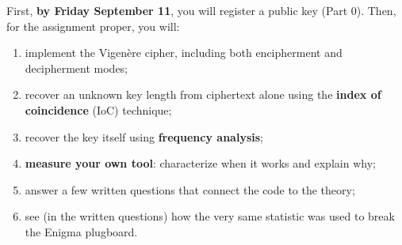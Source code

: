 \documentclass[11pt]{article}
\begin{document}
\medskip\noindent First, \textbf{by Friday September 11}, you will register a public key (Part 0). Then, for the assignment proper, you will:

\medskip
\begin{enumerate}
\item implement the Vigen\`ere cipher, including both encipherment and decipherment modes;
\item recover an unknown key length from ciphertext alone using the \textbf{index of coincidence} (IoC) technique;
\item recover the key itself using \textbf{frequency analysis};
\item \textbf{measure your own tool}: characterize when it works and explain why;
\item answer a few written questions that connect the code to the theory;
\item see (in the written questions) how the very same statistic was used to break the Enigma plugboard.
\end{enumerate}
\end{document}
